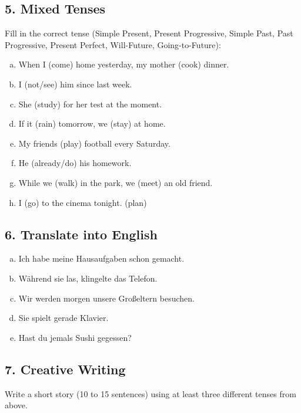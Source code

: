 \subsection*{5. Mixed Tenses}
Fill in the correct tense (Simple Present, Present Progressive, Simple Past, Past Progressive, Present Perfect, Will-Future, Going-to-Future):
\begin{enumerate}[a)]
    \item When I \underline{\hspace{2cm}} (come) home yesterday, my mother \underline{\hspace{2cm}} (cook) dinner.
    \item I \underline{\hspace{2cm}} (not/see) him since last week.
    \item She \underline{\hspace{2cm}} (study) for her test at the moment.
    \item If it \underline{\hspace{2cm}} (rain) tomorrow, we \underline{\hspace{2cm}} (stay) at home.
    \item My friends \underline{\hspace{2cm}} (play) football every Saturday.
    \item He \underline{\hspace{2cm}} (already/do) his homework.
    \item While we \underline{\hspace{2cm}} (walk) in the park, we \underline{\hspace{2cm}} (meet) an old friend.
    \item I \underline{\hspace{2cm}} (go) to the cinema tonight. (plan)
\end{enumerate}

\subsection*{6. Translate into English}
\begin{enumerate}[a)]
    \item Ich habe meine Hausaufgaben schon gemacht.\hspace{1cm} 
    \item Während sie las, klingelte das Telefon.\hspace{1cm} 
    \item Wir werden morgen unsere Großeltern besuchen.\hspace{1cm} 
    \item Sie spielt gerade Klavier.\hspace{1cm} 
    \item Hast du jemals Sushi gegessen?\hspace{1cm} 
\end{enumerate}

\subsection*{7. Creative Writing}
Write a short story (10 to 15 sentences) using at least three different tenses from above.

